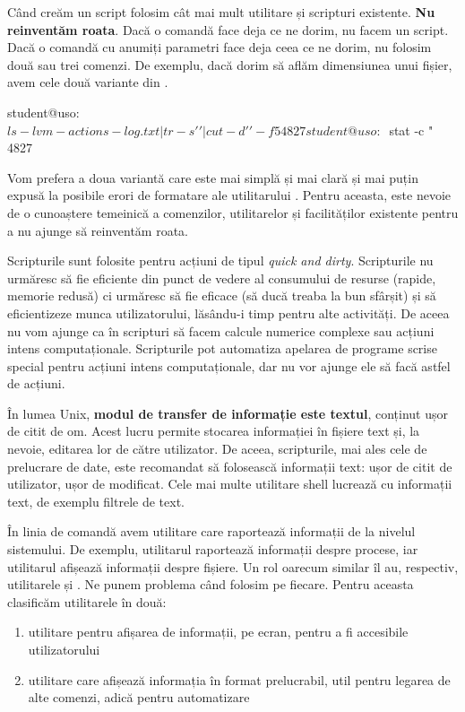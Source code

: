 Când creăm un script folosim cât mai mult utilitare și scripturi existente.
\textbf{Nu reinventăm roata}.
Dacă o comandă face deja ce ne dorim, nu facem un script.
Dacă o comandă cu anumiți parametri face deja ceea ce ne dorim, nu folosim două sau trei comenzi.
De exemplu, dacă dorim să aflăm dimensiunea unui fișier, avem cele două variante din .

\begin{screen}[caption={Afișarea informațiilor despre un fișier (ls vs stat)},label={lst:auto:ls-vs-stat}]
student@uso:~$ ls -l vm-actions-log.txt  | tr -s ' ' | cut -d ' ' -f 5
4827
student@uso:~$ stat -c "%
4827
\end{screen}

Vom prefera a doua variantă care este mai simplă și mai clară și mai puțin expusă la posibile erori de formatare ale utilitarului .
Pentru aceasta, este nevoie de o cunoaștere temeinică a comenzilor, utilitarelor și facilităților existente pentru a nu ajunge să reinventăm roata.

Scripturile sunt folosite pentru acțiuni de tipul \textit{quick and dirty}.
Scripturile nu urmăresc să fie eficiente din punct de vedere al consumului de resurse (rapide, memorie redusă) ci urmăresc să fie eficace (să ducă treaba la bun sfârșit) și să eficientizeze munca utilizatorului, lăsându-i timp pentru alte activități.
De aceea nu vom ajunge ca în scripturi să facem calcule numerice complexe sau acțiuni intens computaționale.
Scripturile pot automatiza apelarea de programe scrise special pentru acțiuni intens computaționale, dar nu vor ajunge ele să facă astfel de acțiuni.

În lumea Unix, \textbf{modul de transfer de informație este textul}, conținut ușor de citit de om.
Acest lucru permite stocarea informației în fișiere text și, la nevoie, editarea lor de către utilizator.
De aceea, scripturile, mai ales cele de prelucrare de date, este recomandat să folosească informații text: ușor de citit de utilizator, ușor de modificat.
Cele mai multe utilitare shell lucrează cu informații text, de exemplu filtrele de text.

În linia de comandă avem utilitare care raportează informații de la nivelul sistemului.
De exemplu, utilitarul  raportează informații despre procese, iar utilitarul  afișează informații despre fișiere.
Un rol oarecum similar îl au, respectiv, utilitarele  și .
Ne punem problema când folosim pe fiecare.
Pentru aceasta clasificăm utilitarele în două:
\begin{enumerate}
  \item utilitare pentru afișarea de informații, pe ecran, pentru a fi accesibile utilizatorului
  \item utilitare care afișează informația în format prelucrabil, util pentru legarea de alte comenzi, adică pentru automatizare
\end{enumerate}

